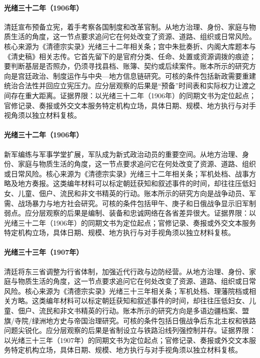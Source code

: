 \hypertarget{social:EQ-1906-CONSTITUTIONAL-PROMISE}{}\paragraph{光绪三十二年（1906年）}清廷宣布预备立宪，着手考察各国制度和改革官制。从地方治理、身份、家庭与物质生活的角度，这一节点要求追问它在何处改变了资源、道路、组织或日常风险。核心来源为《清德宗实录》光绪三十二年相关条；宫中朱批奏折、内阁大库题本与《清史稿》相关志传。它首先留下的是官府分类、任命、处置或资源调拨的痕迹；要判断基层是否照办，仍须寻找县档、账簿、契约或后续案件。账本所示的研究方向是宫廷政治、制度运作与中央—地方信息链研究。可核的条件包括新政需要重建统治合法性并回应立宪压力。应分层观察的后果是“预备”时间表和实际权力让渡之间存在重大距离。证据界限：以光绪三十二年（1906年）的同期文书为定位起点；官修记录、奏报或外交文本服务特定机构立场，具体日期、规模、地方执行与对手视角须以独立材料复核。
\hypertarget{social:EQ-1906-NEW-ARMY-REFORM}{}\paragraph{光绪三十二年（1906年）}新军编练与军事学堂扩展，军队成为新式政治动员的重要空间。从地方治理、身份、家庭与物质生活的角度，这一节点要求追问它在何处改变了资源、道路、组织或日常风险。核心来源为《清德宗实录》光绪三十二年相关条；军机处档、战事方略及地方奏报。这类编年材料可以标定朝廷获知和叙述事件的时间，却往往压低妇女、儿童、佃户、流民和非文书精英的行动。账本所示的研究方向是战争动员、军需、战场暴力与地方社会研究。可核的条件包括甲午、庚子和日俄战争显示旧军制弱点。应分层观察的后果是编制、装备和忠诚网络在各省差异很大。证据界限：以光绪三十二年（1906年）的同期文书为定位起点；官修记录、奏报或外交文本服务特定机构立场，具体日期、规模、地方执行与对手视角须以独立材料复核。
\hypertarget{social:EQ-1907-MANCHURIAN-PROVINCES}{}\paragraph{光绪三十三年（1907年）}清廷将东三省调整为行省体制，加强近代行政与边防经营。从地方治理、身份、家庭与物质生活的角度，这一节点要求追问它在何处改变了资源、道路、组织或日常风险。核心来源为《清德宗实录》光绪三十三年相关条；军机处档、理藩院档或相关方略。这类编年材料可以标定朝廷获知和叙述事件的时间，却往往压低妇女、儿童、佃户、流民和非文书精英的行动。账本所示的研究方向是多语边疆档案、盟旗/寺院/绿洲地方史与帝国治理研究。可核的条件包括日俄战争后东北主权和铁路问题尖锐化。应分层观察的后果是省制设立与铁路沿线列强控制并存。证据界限：以光绪三十三年（1907年）的同期文书为定位起点；官修记录、奏报或外交文本服务特定机构立场，具体日期、规模、地方执行与对手视角须以独立材料复核。
